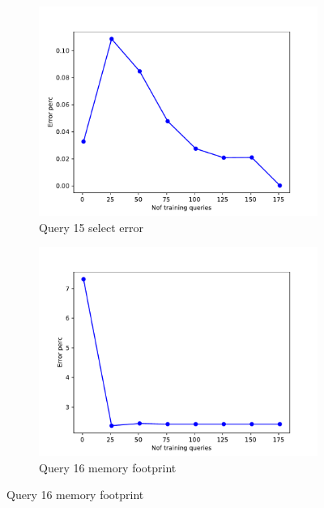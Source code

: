 \begin{figure}[!htb]
    \begin{subfigure}[t]{0.5\textwidth}
      \includegraphics[scale=0.4]{figs/tpch10/tpch10_sel15_error.pdf}
      \caption{Query 15 select error}
      \label{fig:tpch_sel15}
    \end{subfigure}
    \begin{subfigure}[t]{0.5\textwidth}
      \includegraphics[scale=0.4]{figs/tpch10/tpch10_sel16_error.pdf}
      \caption{Query 16 memory footprint}
      \label{fig:tpch_sel16}
     \end{subfigure}


\end{figure}
